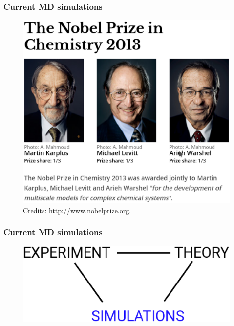 \documentclass{beamer}
\begin{document}
\begin{frame}\frametitle{Current MD simulations}

\begin{figure}
\includegraphics[scale=0.36]{nobel_prize.eps}
\caption{{\scriptsize Credits: http://www.nobelprize.org.}}
\end{figure}

\end{frame}



\begin{frame}\frametitle{Current MD simulations}

\begin{figure}
\includegraphics[scale=0.39]{three_approaches.eps}
\end{figure}

\end{frame}
\end{document}
